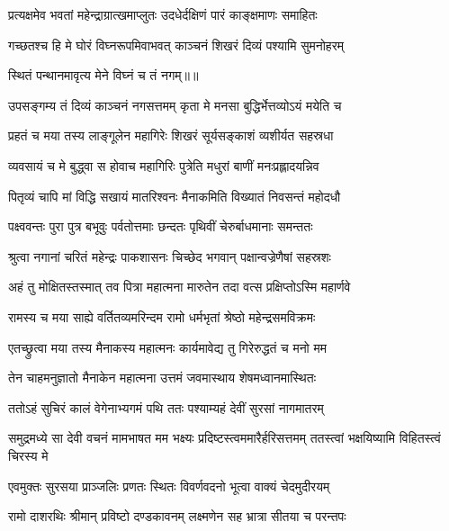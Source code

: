 \twolineshloka
{प्रत्यक्षमेव भवतां महेन्द्राग्रात्खमाप्लुतः}
{उदधेर्दक्षिणं पारं काङ्क्षमाणः समाहितः} %

\twolineshloka
{गच्छतश्च हि मे घोरं विघ्नरूपमिवाभवत्}
{काञ्चनं शिखरं दिव्यं पश्यामि सुमनोहरम्} %

{स्थितं पन्थानमावृत्य मेने विघ्नं च तं नगम्॥॥} %

\addtocounter{shlokacount}{1}

\twolineshloka
{उपसङ्गम्य तं दिव्यं काञ्चनं नगसत्तमम्}
{कृता मे मनसा बुद्धिर्भेत्तव्योऽयं मयेति च} %

\twolineshloka
{प्रहतं च मया तस्य लाङ्गूलेन महागिरेः}
{शिखरं सूर्यसङ्काशं व्यशीर्यत सहस्रधा} %

\twolineshloka
{व्यवसायं च मे बुद्ध्वा स होवाच महागिरिः}
{पुत्रेति मधुरां बाणीं मनःप्रह्लादयन्निव} %

\twolineshloka
{पितृव्यं चापि मां विद्धि सखायं मातरिश्वनः}
{मैनाकमिति विख्यातं निवसन्तं महोदधौ} %

\twolineshloka
{पक्ष्ववन्तः पुरा पुत्र बभूवुः पर्वतोत्तमाः}
{छन्दतः पृथिवीं चेरुर्बाधमानाः समन्ततः} %

\twolineshloka
{श्रुत्वा नगानां चरितं महेन्द्रः पाकशासनः}
{चिच्छेद भगवान् पक्षान्वज्रेणैषां सहस्रशः} %

\twolineshloka
{अहं तु मोक्षितस्तस्मात् तव पित्रा महात्मना}
{मारुतेन तदा वत्स प्रक्षिप्तोऽस्मि महार्णवे} %

\twolineshloka
{रामस्य च मया साह्ये वर्तितव्यमरिन्दम}
{रामो धर्मभृतां श्रेष्ठो महेन्द्रसमविक्रमः} %

\twolineshloka
{एतच्छ्रुत्वा मया तस्य मैनाकस्य महात्मनः}
{कार्यमावेद्य तु गिरेरुद्धतं च मनो मम} %

\twolineshloka
{तेन चाहमनुज्ञातो मैनाकेन महात्मना}
{उत्तमं जवमास्थाय शेषमध्वानमास्थितः} %

\twolineshloka
{ततोऽहं सुचिरं कालं वेगेनाभ्यगमं पथि}
{ततः पश्याम्यहं देवीं सुरसां नागमातरम्} %

\threelineshloka
{समुद्रमध्ये सा देवी वचनं मामभाषत}
{मम भक्ष्यः प्रदिष्टस्त्वममारैर्हरिसत्तमम्}
{ततस्त्वां भक्षयिष्यामि विहितस्त्वं चिरस्य मे} %

\twolineshloka
{एवमुक्तः सुरसया प्राञ्जलिः प्रणतः स्थितः}
{विवर्णवदनो भूत्वा वाक्यं चेदमुदीरयम्} %

\twolineshloka
{रामो दाशरथिः श्रीमान् प्रविष्टो दण्डकावनम्}
{लक्ष्मणेन सह भ्रात्रा सीतया च परन्तपः} %

